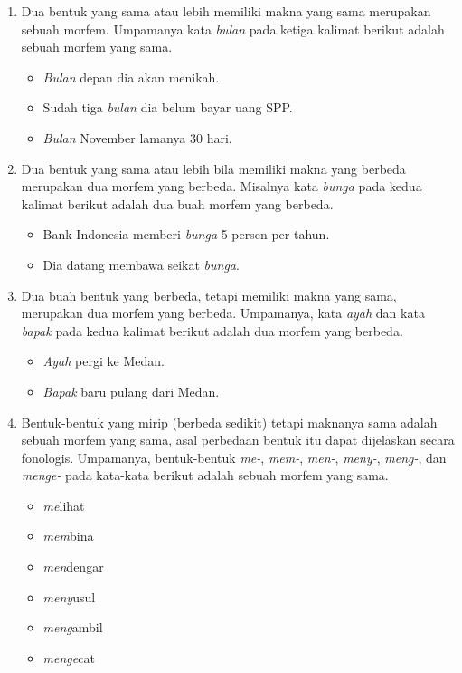 \begin{enumerate}
	\item Dua bentuk yang sama atau lebih memiliki makna yang sama merupakan sebuah morfem. Umpamanya kata \textit{bulan} pada ketiga kalimat berikut adalah sebuah morfem yang sama.
	\begin{itemize}
		\item \textit{Bulan} depan dia akan menikah.
		\item Sudah tiga \textit{bulan} dia belum bayar uang SPP.
		\item \textit{Bulan} November lamanya 30 hari.
	\end{itemize}
	
	\item Dua bentuk yang sama atau lebih bila memiliki makna yang berbeda merupakan dua morfem yang berbeda. Misalnya kata \textit{bunga} pada kedua kalimat berikut adalah dua buah morfem yang berbeda.
	\begin{itemize}
		\item Bank Indonesia memberi \textit{bunga} 5 persen per tahun.
		\item Dia datang membawa seikat \textit{bunga}.
	\end{itemize}
	
	\item Dua buah bentuk yang berbeda, tetapi memiliki makna yang sama, merupakan dua morfem yang berbeda. Umpamanya, kata \textit{ayah} dan kata \textit{bapak} pada kedua kalimat berikut adalah dua morfem yang berbeda.
	\begin{itemize}
		\item \textit{Ayah} pergi ke Medan.
		\item \textit{Bapak} baru pulang dari Medan.
	\end{itemize}
	
	\item Bentuk-bentuk yang mirip (berbeda sedikit) tetapi maknanya sama adalah sebuah morfem yang sama, asal perbedaan bentuk itu dapat dijelaskan secara fonologis. Umpamanya, bentuk-bentuk \textit{me-}, \textit{mem-}, \textit{men-}, \textit{meny-}, \textit{meng-}, dan \textit{menge-} pada kata-kata berikut adalah sebuah morfem yang sama.
	\begin{itemize}
		\item \textit{me}lihat
		\item \textit{mem}bina
		\item \textit{men}dengar
		\item \textit{meny}usul
		\item \textit{meng}ambil
		\item \textit{menge}cat
	\end{itemize}
	

\end{enumerate}
